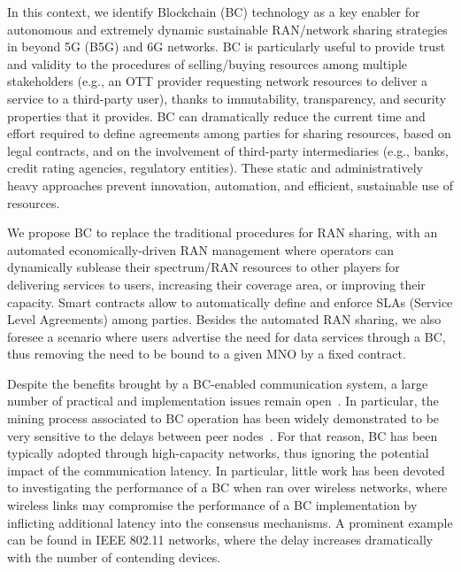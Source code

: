 \documentclass[conference]{IEEEtran}
\theoremstyle{definition}
\begin{document}
In this context, we identify Blockchain (BC) technology as a key enabler for autonomous and extremely dynamic sustainable RAN/network sharing strategies in beyond 5G (B5G) and 6G networks. BC is particularly useful to provide trust and validity to the procedures of selling/buying resources among multiple stakeholders (e.g., an OTT provider requesting network resources to deliver a service to a third-party user), thanks to immutability, transparency, and security properties that it provides. BC can dramatically reduce the current time and effort required to define agreements among parties for sharing resources, based on legal contracts, and on the involvement of third-party intermediaries (e.g., banks, credit rating agencies, regulatory entities). These static and administratively heavy approaches prevent innovation, automation, and efficient, sustainable use of resources.

We propose BC to replace the traditional procedures for RAN sharing, with an automated economically-driven RAN management where operators can dynamically sublease their spectrum/RAN resources to other players for delivering services to users, increasing their coverage area, or improving their capacity. Smart contracts allow to automatically define and enforce SLAs (Service Level Agreements) among parties. Besides the automated RAN sharing, we also foresee a scenario where users advertise the need for data services through a BC, thus removing the need to be bound to a given MNO by a fixed contract. %

Despite the benefits brought by a BC-enabled communication system, a large number of practical and implementation issues remain open~\cite{reyna2018blockchain}. In particular, the mining process associated to BC operation has been widely demonstrated to be very sensitive to the delays between peer nodes~\cite{gobel2016bitcoin}. For that reason, BC has been typically adopted through high-capacity networks, thus ignoring the potential impact of the communication latency. In particular, little work has been devoted to investigating the performance of a BC when ran over wireless networks, where wireless links may compromise the performance of a BC implementation by inflicting additional latency into the consensus mechanisms. A prominent example can be found in IEEE 802.11 networks, where the delay increases dramatically with the number of contending devices.
\end{document}
